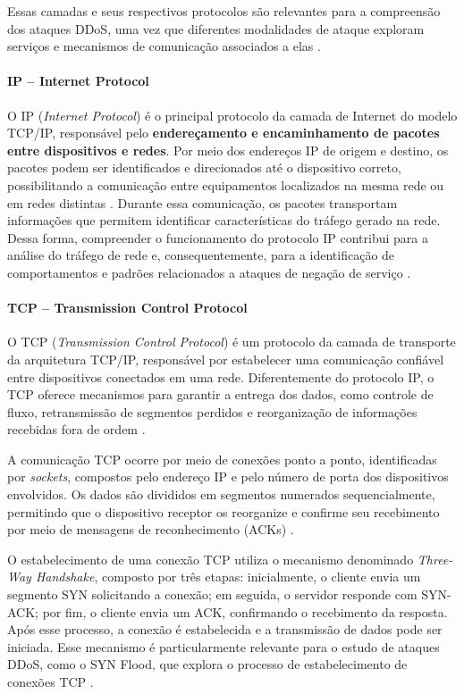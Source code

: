 \documentclass[
    12pt,                %
    openright,           %
    oneside,             %
    a4paper,             %
    english,             %
    brazil               %
]{abntex2}
\begin{document}
Essas camadas e seus respectivos protocolos são relevantes para a compreensão dos ataques DDoS, uma vez que diferentes modalidades de ataque exploram serviços e mecanismos de comunicação associados a elas \cite{sharafaldin2019}.

\paragraph{IP -- Internet Protocol}

O IP (\textit{Internet Protocol}) é o principal protocolo da camada de Internet do modelo TCP/IP, responsável pelo \textbf{endereçamento e encaminhamento de pacotes entre dispositivos e redes}. Por meio dos endereços IP de origem e destino, os pacotes podem ser identificados e direcionados até o dispositivo correto, possibilitando a comunicação entre equipamentos localizados na mesma rede ou em redes distintas \cite{tanenbaum2011,stevens1994}. Durante essa comunicação, os pacotes transportam informações que permitem identificar características do tráfego gerado na rede. Dessa forma, compreender o funcionamento do protocolo IP contribui para a análise do tráfego de rede e, consequentemente, para a identificação de comportamentos e padrões relacionados a ataques de negação de serviço \cite{sharafaldin2019}.

\paragraph{TCP -- Transmission Control Protocol}

O TCP (\textit{Transmission Control Protocol}) é um protocolo da camada de transporte da arquitetura TCP/IP, responsável por estabelecer uma comunicação confiável entre dispositivos conectados em uma rede. Diferentemente do protocolo IP, o TCP oferece mecanismos para garantir a entrega dos dados, como controle de fluxo, retransmissão de segmentos perdidos e reorganização de informações recebidas fora de ordem \cite{tanenbaum2011}.

A comunicação TCP ocorre por meio de conexões ponto a ponto, identificadas por \textit{sockets}, compostos pelo endereço IP e pelo número de porta dos dispositivos envolvidos. Os dados são divididos em segmentos numerados sequencialmente, permitindo que o dispositivo receptor os reorganize e confirme seu recebimento por meio de mensagens de reconhecimento (ACKs) \cite{tanenbaum2011}.

O estabelecimento de uma conexão TCP utiliza o mecanismo denominado \textit{Three-Way Handshake}, composto por três etapas: inicialmente, o cliente envia um segmento SYN solicitando a conexão; em seguida, o servidor responde com SYN-ACK; por fim, o cliente envia um ACK, confirmando o recebimento da resposta. Após esse processo, a conexão é estabelecida e a transmissão de dados pode ser iniciada. Esse mecanismo é particularmente relevante para o estudo de ataques DDoS, como o SYN Flood, que explora o processo de estabelecimento de conexões TCP \cite{sharafaldin2019}.
\end{document}
